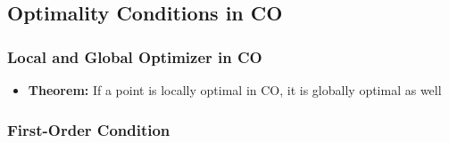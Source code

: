 \subsection{Optimality Conditions in CO}

\subsubsection*{Local and Global Optimizer in CO}
\begin{itemize}
    \item \textbf{Theorem:} If a point is locally optimal in CO, it is globally optimal as well
\end{itemize}

\subsubsection*{First-Order Condition}
